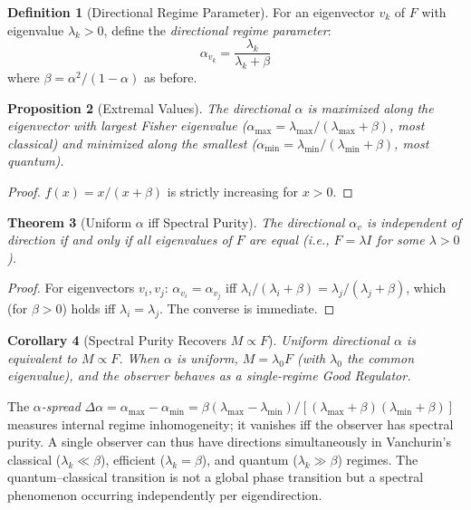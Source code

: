 \documentclass[11pt,a4paper]{article}
\theoremstyle{plain}
\newtheorem{theorem}{Theorem}[section]
\newtheorem{proposition}[theorem]{Proposition}
\newtheorem{corollary}[theorem]{Corollary}
\theoremstyle{definition}
\newtheorem{definition}[theorem]{Definition}
\theoremstyle{remark}
\begin{document}
\begin{definition}[Directional Regime Parameter]
\label{def:directional_alpha}
For an eigenvector $v_k$ of $F$ with eigenvalue $\lambda_k > 0$, define the \emph{directional regime parameter}:
\begin{equation}
\label{eq:dir_alpha}
\alpha_{v_k} = \frac{\lambda_k}{\lambda_k + \beta}
\end{equation}
where $\beta = \alpha^2/(1-\alpha)$ as before.
\end{definition}

\begin{proposition}[Extremal Values]
\label{prop:alpha_eigen}
The directional $\alpha$ is maximized along the eigenvector with largest Fisher eigenvalue ($\alpha_{\max} = \lambda_{\max}/(\lambda_{\max}+\beta)$, most classical) and minimized along the smallest ($\alpha_{\min} = \lambda_{\min}/(\lambda_{\min}+\beta)$, most quantum).
\end{proposition}
\begin{proof}
$f(x) = x/(x+\beta)$ is strictly increasing for $x > 0$.
\end{proof}

\begin{theorem}[Uniform $\alpha$ iff Spectral Purity]
\label{thm:uniform_alpha}
The directional $\alpha_v$ is independent of direction if and only if all eigenvalues of $F$ are equal (i.e., $F = \lambda I$ for some $\lambda > 0$).
\end{theorem}
\begin{proof}
For eigenvectors $v_i, v_j$: $\alpha_{v_i} = \alpha_{v_j}$ iff $\lambda_i/(\lambda_i+\beta) = \lambda_j/(\lambda_j+\beta)$, which (for $\beta > 0$) holds iff $\lambda_i = \lambda_j$. The converse is immediate.
\end{proof}

\begin{corollary}[Spectral Purity Recovers $M \propto F$]
\label{cor:purity_mf}
Uniform directional $\alpha$ is equivalent to $M \propto F$.
When $\alpha$ is uniform, $M = \lambda_0 F$ (with $\lambda_0$ the
common eigenvalue), and the observer behaves as a single-regime
Good Regulator.
\end{corollary}

The \emph{$\alpha$-spread} $\Delta\alpha = \alpha_{\max} - \alpha_{\min} = \beta(\lambda_{\max}-\lambda_{\min})/[(\lambda_{\max}+\beta)(\lambda_{\min}+\beta)]$ measures internal regime inhomogeneity; it vanishes iff the observer has spectral purity. A single observer can thus have directions simultaneously in Vanchurin's classical ($\lambda_k \ll \beta$), efficient ($\lambda_k = \beta$), and quantum ($\lambda_k \gg \beta$) regimes. The quantum--classical transition is not a global phase transition but a spectral phenomenon occurring independently per eigendirection.
\end{document}
